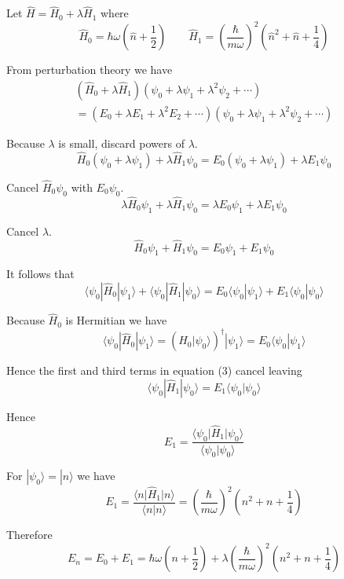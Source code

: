 \documentclass[12pt]{article}
\begin{document}
Let $\hat H=\hat H_0+\lambda\hat H_1$ where
\begin{equation*}
\hat H_0=\hbar\omega\left(\hat n+\frac{1}{2}\right)
\qquad
\hat H_1=\left(\frac{\hbar}{m\omega}\right)^2\left(\hat n^2+\hat n+\frac{1}{4}\right)
\end{equation*}

From perturbation theory we have
\begin{multline*}
\left(\hat H_0+\lambda\hat H_1\right)\left(\psi_0+\lambda\psi_1+\lambda^2\psi_2+\cdots\right)
\\
=\left(E_0+\lambda E_1+\lambda^2 E_2+\cdots\right)\left(\psi_0+\lambda\psi_1+\lambda^2\psi_2+\cdots\right)
\end{multline*}

Because $\lambda$ is small, discard powers of $\lambda$.
\begin{equation*}
\hat H_0(\psi_0+\lambda\psi_1)+\lambda \hat H_1\psi_0=E_0(\psi_0+\lambda\psi_1)+\lambda E_1\psi_0
\end{equation*}

Cancel $\hat H_0\psi_0$ with $E_0\psi_0$.
\begin{equation*}
\lambda\hat H_0\psi_1+\lambda \hat H_1\psi_0=\lambda E_0\psi_1+\lambda E_1\psi_0
\end{equation*}

Cancel $\lambda$.
\begin{equation*}
\hat H_0\psi_1+\hat H_1\psi_0=E_0\psi_1+E_1\psi_0
\end{equation*}

It follows that
\begin{equation*}
\langle\psi_0|\hat H_0|\psi_1\rangle
+\langle\psi_0|\hat H_1|\psi_0\rangle
=E_0\langle\psi_0|\psi_1\rangle
+E_1\langle\psi_0|\psi_0\rangle
\tag{3}
\end{equation*}

Because $\hat H_0$ is Hermitian we have
\begin{equation*}
\langle\psi_0|\hat H_0|\psi_1\rangle=\left(\hat H_0|\psi_0\rangle\right)^\dag|\psi_1\rangle
=E_0\langle\psi_0|\psi_1\rangle
\end{equation*}

Hence the first and third terms in equation (3) cancel leaving
\begin{equation*}
\langle\psi_0|\hat H_1|\psi_0\rangle
=E_1\langle\psi_0|\psi_0\rangle
\end{equation*}

Hence
\begin{equation*}
E_1=\frac{\langle\psi_0\vert\hat H_1\vert\psi_0\rangle}{\langle\psi_0\vert\psi_0\rangle}
\end{equation*}

For $|\psi_0\rangle=|n\rangle$ we have
\begin{equation*}
E_1=\frac{\langle n\vert\hat H_1\vert n\rangle}{\langle n\vert n\rangle}
=\left(\frac{\hbar}{m\omega}\right)^2\left(n^2+n+\frac{1}{4}\right)
\end{equation*}

Therefore
\begin{equation*}
E_n=E_0+E_1=\hbar\omega\left(n+\frac{1}{2}\right)+\lambda\left(\frac{\hbar}{m\omega}\right)^2\left(n^2+n+\frac{1}{4}\right)
\end{equation*}
\end{document}
